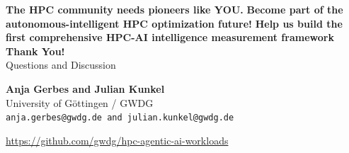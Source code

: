 \documentclass[compress,aspectratio=169]{beamer}
\begin{document}
\begin{frame}
    \small \textbf{\textcolor{hpcred}{The HPC community needs pioneers like YOU.}}
    \vspace{-0.5cm}
    \newline
    \small \textbf{\textcolor{hpcred}{Become part of the autonomous-intelligent HPC optimization future!}}
    \vspace{-0.5cm}
    \newline
    \small \textbf{\textcolor{hpcred}{Help us build the first comprehensive HPC-AI intelligence measurement framework}}
    \newline
    \Huge \textbf{Thank You!}
    \\
    \Large Questions and Discussion
    
    \vspace{1.5em}
    \normalsize
    \textbf{Anja Gerbes and Julian Kunkel }\\
    University of Göttingen / GWDG\\
    \texttt{anja.gerbes@gwdg.de and julian.kunkel@gwdg.de}
    
    \vspace{0.8em}
    \url{https://github.com/gwdg/hpc-agentic-ai-workloads}
\end{frame}
\end{document}
